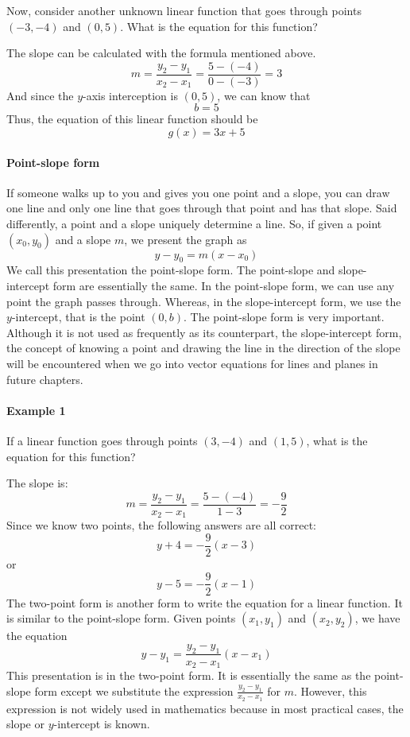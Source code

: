 Now, consider another unknown linear function that goes through points $(-3, -4)$ and $(0, 5)$. What is the equation for this function?

The slope can be calculated with the formula mentioned above.
$$
m = \frac{y_2 - y_1}{x_2 - x_1} = \frac{5 - (-4)}{0 - (-3)} = 3
$$
And since the $y$-axis interception is $(0, 5)$, we can know that
$$
b = 5
$$
Thus, the equation of this linear function should be
$$
g(x) = 3x + 5
$$
\paragraph{Point-slope form}

If someone walks up to you and gives you one point and a slope, you can draw one line and only one line that goes through that point and has that slope. Said differently, a point and a slope uniquely determine a line. So, if given a point $(x_0, y_0)$ and a slope $m$, we present the graph as
$$
y - y_0 = m(x - x_0)
$$
We call this presentation the point-slope form. The point-slope and slope-intercept form are essentially the same. In the point-slope form, we can use any point the graph passes through. Whereas, in the slope-intercept form, we use the $y$-intercept, that is the point $(0, b)$. The point-slope form is very important. Although it is not used as frequently as its counterpart, the slope-intercept form, the concept of knowing a point and drawing the line in the direction of the slope will be encountered when we go into vector equations for lines and planes in future chapters.

\paragraph{Example 1}

If a linear function goes through points $(3, -4)$ and $(1, 5)$, what is the equation for this function?

The slope is:
$$
m = \frac{y_2 - y_1}{x_2 - x_1} = \frac{5 - (-4)}{1 - 3} = -\frac{9}{2}
$$
Since we know two points, the following answers are all correct:
$$
y + 4 = -\frac{9}{2}(x - 3)
$$
or
$$
y - 5 = -\frac{9}{2}(x - 1)
$$
The two-point form is another form to write the equation for a linear function. It is similar to the point-slope form. Given points $(x_1, y_1)$ and $(x_2, y_2)$, we have the equation
$$
y - y_1 = \frac{y_2 - y_1}{x_2 - x_1}(x - x_1)
$$
This presentation is in the two-point form. It is essentially the same as the point-slope form except we substitute the expression $\frac{y_2 - y_1}{x_2 - x_1}$ for $m$. However, this expression is not widely used in mathematics because in most practical cases, the slope or $y$-intercept is known.

